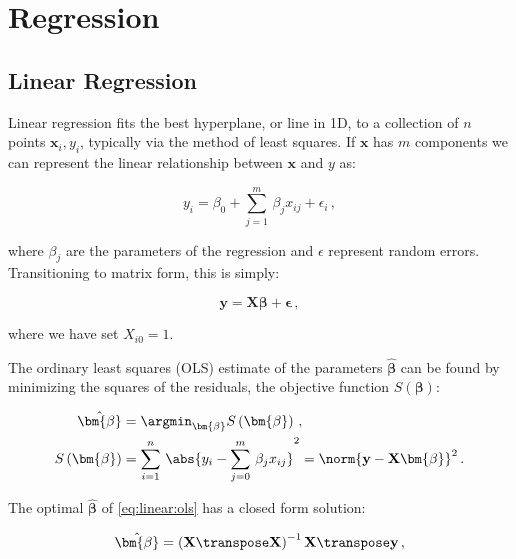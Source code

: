 \chapter{Regression}
\label{chap:regression}

\section{Linear Regression}
\label{regression:linear}

Linear regression fits the best hyperplane, or line in 1D,
to a collection of $n$ points $\mathbf{x}_{i}, y_{i}$,
typically via the method of least squares.
If $\mathbf{x}$ has $m$ components we can represent the
linear relationship between $\mathbf{x}$ and $y$ as:

\begin{equation}\label{eq:linear:onepoint}
y_{i} = \beta_{0} + \sum_{j=1}^{m}\, \beta_{j} x_{ij} + \epsilon_{i}\,,
\end{equation}

\noindent where $\beta_{j}$ are the parameters of the regression
and $\epsilon$ represent random errors.
Transitioning to matrix form, this is simply:

\begin{equation}\label{eq:linear:matrix}
\mathbf{y} = \mathbf{X} \bm{\beta} + \bm{\epsilon}\,,
\end{equation}

\noindent where we have set $X_{i0} =1$.

The ordinary least squares (OLS) estimate of the parameters $\hat{\bm{\beta}}$
can be found by minimizing the squares of the residuals,
\ie the objective function $S\left(\bm{\beta}\right)$:

\begin{subequations} \label{eq:linear:ols}
\begin{align}
\hat{\bm{\beta}} &= \argmin_{\bm{\beta}} S\left(\bm{\beta}\right)\,, \label{eq:linear:argmin} \\
S\left(\bm{\beta}\right) &= \sum_{i=1}^{n} \, \abs{y_{i} - \sum_{j=0}^{m} \, \beta_{j} x_{ij}}^{2} = \norm{\mathbf{y} - \mathbf{X} \bm{\beta}}^{2}\,. \label{eq:linear:S}
\end{align}
\end{subequations}

\noindent The optimal $\hat{\bm{\beta}}$ of \cref{eq:linear:ols} has a closed form solution:

\begin{equation}\label{eq:linear:betahat}
\hat{\bm{\beta}} = \left(\mathbf{X}\transpose\mathbf{X}\right)^{-1}\mathbf{X}\transpose \mathbf{y}\,,
\end{equation}

